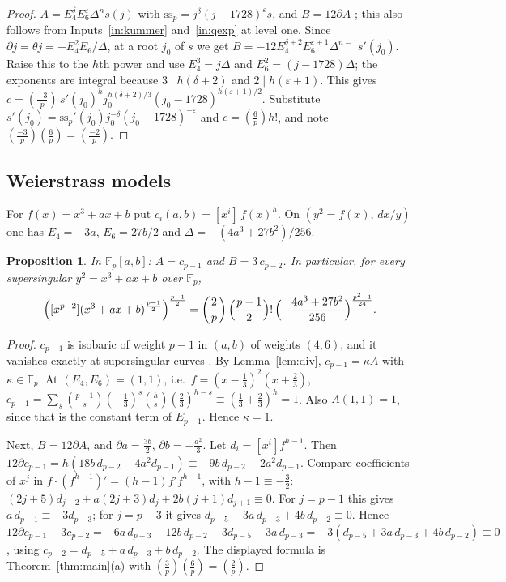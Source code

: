 \documentclass[11pt,a4paper]{article}
\numberwithin{equation}{section}
\newtheorem{proposition}[theorem]{Proposition}
\theoremstyle{definition}
\theoremstyle{remark}
\newcommand{\Fp}{\mathbb F_p}
\newcommand{\Fb}{\overline{\mathbb F}_p}
\newcommand{\Lp}[1]{\left(\frac{#1}{p}\right)}
\newcommand{\leg}[2]{\left(\frac{#1}{#2}\right)}
\begin{document}
\begin{proof}
$A=E_4^\delta E_6^\varepsilon\Delta^ns(j)$ with $\mathrm{ss}_p=j^\delta(j-1728)^\varepsilon s$, and
$B=12\partial A$ \cite[Prop.~1.3]{Baker98}; this also follows from Inputs~\ref{in:kummer}
and~\ref{in:qexp} at level one. Since $\partial j=\theta j=-E_4^2E_6/\Delta$, at a root
$j_0$ of $s$ we get $B=-12E_4^{\delta+2}E_6^{\varepsilon+1}\Delta^{n-1}s'(j_0)$. Raise this to
the $h$th power and use $E_4^3=j\Delta$ and $E_6^2=(j-1728)\Delta$; the exponents are
integral because $3\mid h(\delta+2)$ and $2\mid h(\varepsilon+1)$. This gives
$c=\leg{-3}p\,s'(j_0)^hj_0^{h(\delta+2)/3}(j_0-1728)^{h(\varepsilon+1)/2}$. Substitute
$s'(j_0)=\mathrm{ss}_p'(j_0)j_0^{-\delta}(j_0-1728)^{-\varepsilon}$ and $c=\Lp6h!$, and note
$\leg{-3}p\Lp6=\leg{-2}p$.
\end{proof}

\subsection{Weierstrass models}
For $f(x)=x^3+ax+b$ put $c_i(a,b)=[x^i]\,f(x)^h$. On $(y^2=f(x),\,dx/y)$ one has
$E_4=-3a$, $E_6=27b/2$ and $\Delta=-(4a^3+27b^2)/256$.

\begin{proposition}\label{prop:HW}
In $\Fp[a,b]$: $A=c_{p-1}$ and $B=3\,c_{p-2}$. In particular, for every supersingular
$y^2=x^3+ax+b$ over $\Fb$,
\[
\Bigl([x^{p-2}](x^3+ax+b)^{\frac{p-1}2}\Bigr)^{\frac{p-1}2}=\Lp2\Bigl(\frac{p-1}2\Bigr)!\,
\Bigl(-\frac{4a^3+27b^2}{256}\Bigr)^{\frac{p^2-1}{24}}.
\]
\end{proposition}

\begin{proof}
$c_{p-1}$ is isobaric of weight $p-1$ in $(a,b)$ of weights $(4,6)$, and it vanishes exactly at
supersingular curves \cite[Thm.~V.4.1(a)]{Silverman}. By Lemma~\ref{lem:div}, $c_{p-1}=\kappa A$
with $\kappa\in\Fp$. At $(E_4,E_6)=(1,1)$, i.e.\ $f=(x-\frac13)^2(x+\frac23)$,
$c_{p-1}=\sum_s\binom{p-1}{s}(-\frac13)^s\binom hs(\frac23)^{h-s}\equiv(\frac13+\frac23)^h=1$.
Also $A(1,1)=1$, since that is the constant term of $E_{p-1}$. Hence $\kappa=1$.

Next, $B=12\partial A$, and $\partial a=\frac{3b}{2}$, $\partial b=-\frac{a^2}3$. Let
$d_i=[x^i]f^{h-1}$. Then $12\partial c_{p-1}=h(18b\,d_{p-2}-4a^2d_{p-1})\equiv-9b\,d_{p-2}+2a^2d_{p-1}$.
Compare coefficients of $x^j$ in $f\cdot(f^{h-1})'=(h-1)f'f^{h-1}$, with $h-1\equiv-\frac32$:
$(2j+5)d_{j-2}+a(2j+3)d_j+2b(j+1)d_{j+1}\equiv0$. For $j=p-1$ this gives $a\,d_{p-1}\equiv-3d_{p-3}$;
for $j=p-3$ it gives $d_{p-5}+3a\,d_{p-3}+4b\,d_{p-2}\equiv0$. Hence
$12\partial c_{p-1}-3c_{p-2}=-6a\,d_{p-3}-12b\,d_{p-2}-3d_{p-5}-3a\,d_{p-3}
=-3(d_{p-5}+3a\,d_{p-3}+4b\,d_{p-2})\equiv0$, using $c_{p-2}=d_{p-5}+a\,d_{p-3}+b\,d_{p-2}$.
The displayed formula is Theorem~\ref{thm:main}(a) with $\leg{3}{p}\Lp6=\Lp2$.
\end{proof}
\end{document}
